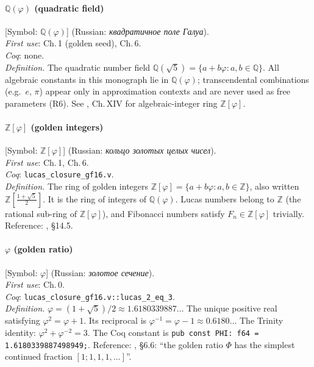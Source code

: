 \paragraph*{\textmd{\textbf{$\mathbb{Q}(\varphi)$ (quadratic field)}}}
\label{entry:quad-field}
[Symbol: $\mathbb{Q}(\varphi)$] (Russian: \textit{квадратичное поле Галуа}).\\
\textit{First use}: Ch.\,1 (golden seed), Ch.\,6.\\
\textit{Coq}: none.\\
\textit{Definition.}
The quadratic number field $\mathbb{Q}(\sqrt{5}) = \{a + b\varphi : a,b\in\mathbb{Q}\}$.
All algebraic constants in this monograph lie in $\mathbb{Q}(\varphi)$;
transcendental combinations (e.g.\ $e$, $\pi$) appear only in
approximation contexts and are never used as free parameters (R6).
See \cite{hardy_wright}, Ch.\,XIV for algebraic-integer ring $\mathbb{Z}[\varphi]$.

\paragraph*{\textmd{\textbf{$\mathbb{Z}[\varphi]$ (golden integers)}}}
\label{entry:Zphi}
[Symbol: $\mathbb{Z}[\varphi]$] (Russian: \textit{кольцо золотых целых чисел}).\\
\textit{First use}: Ch.\,1, Ch.\,6.\\
\textit{Coq}: \texttt{lucas\_closure\_gf16.v}.\\
\textit{Definition.}
The ring of golden integers $\mathbb{Z}[\varphi] = \{a+b\varphi : a,b\in\mathbb{Z}\}$,
also written $\mathbb{Z}[\frac{1+\sqrt{5}}{2}]$.
It is the ring of integers of $\mathbb{Q}(\varphi)$.
Lucas numbers belong to $\mathbb{Z}$ (the rational sub-ring of $\mathbb{Z}[\varphi]$),
and Fibonacci numbers satisfy $F_n \in \mathbb{Z}[\varphi]$ trivially.
Reference: \cite{hardy_wright}, §14.5.

\paragraph*{\textmd{\textbf{$\varphi$ (golden ratio)}}}
\label{entry:phi}
[Symbol: $\varphi$] (Russian: \textit{золотое сечение}).\\
\textit{First use}: Ch.\,0.\\
\textit{Coq}: \texttt{lucas\_closure\_gf16.v::lucas\_2\_eq\_3}.\\
\textit{Definition.}
$\varphi = (1+\sqrt{5})/2 \approx 1.6180339887\ldots$
The unique positive real satisfying $\varphi^2 = \varphi + 1$.
Its reciprocal is $\varphi^{-1} = \varphi - 1 \approx 0.6180\ldots$
The Trinity identity: $\varphi^2 + \varphi^{-2} = 3$.
The Coq constant is \texttt{pub const PHI: f64 = 1.6180339887498949;}.
Reference: \cite{knuth_concrete_math}, §6.6: ``the golden ratio
$\Phi$ has the simplest continued fraction $[1;1,1,1,\ldots]$''.

